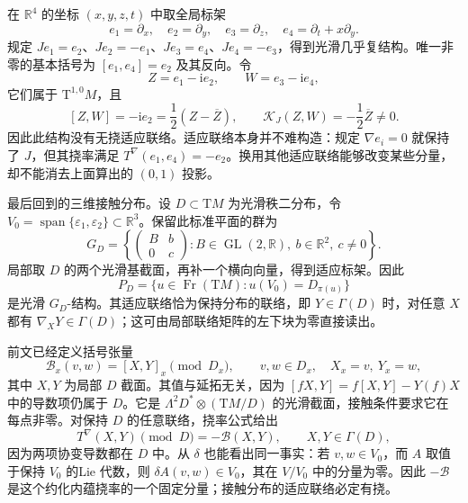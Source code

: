 \begin{example}
	\label{g1:exm:almost-complex-nonzero-intrinsic}
	在 \(\mathbb R^4\) 的坐标 \((x,y,z,t)\) 中取全局标架
	\[
		e_1=\partial_x,\quad e_2=\partial_y,\quad
		e_3=\partial_z,\quad e_4=\partial_t+x\partial_y.
	\]
	规定 \(Je_1=e_2\)、\(Je_2=-e_1\)、\(Je_3=e_4\)、\(Je_4=-e_3\)，得到光滑几乎复结构。唯一非零的基本括号为 \([e_1,e_4]=e_2\) 及其反向。令
	\[
		Z=e_1-\mathrm i e_2,\qquad W=e_3-\mathrm i e_4,
	\]
	它们属于 \(\mathrm{T}^{1,0}M\)，且
	\[
		[Z,W]=-\mathrm i e_2=\frac12(Z-\overline Z),
		\qquad \mathcal K_J(Z,W)=-\frac12\overline Z\neq0.
	\]
	因此此结构没有无挠适应联络。适应联络本身并不难构造：规定 \(\nabla e_i=0\) 就保持了 \(J\)，但其挠率满足 \(T^\nabla(e_1,e_4)=-e_2\)。换用其他适应联络能够改变某些分量，却不能消去上面算出的 \((0,1)\) 投影。
\end{example}

最后回到的三维接触分布。设 \(D\subset\mathrm{T}M\) 为光滑秩二分布，令 \(V_0=\operatorname{span}\{\varepsilon_1,\varepsilon_2\}\subset\mathbb R^3\)。保留此标准平面的群为
\[
	G_D=\left\{\begin{pmatrix}B&b\\0&c\end{pmatrix}:
	B\in\operatorname{GL}(2,\mathbb R),\ b\in\mathbb R^2,\ c\neq0\right\}.
\]
局部取 \(D\) 的两个光滑基截面，再补一个横向向量，得到适应标架。因此
\[
	P_D=\{u\in\operatorname{Fr}(\mathrm{T}M):u(V_0)=D_{\pi(u)}\}
\]
是光滑 \(G_D\)-结构。其适应联络恰为保持分布的联络，即 \(Y\in\Gamma(D)\) 时，对任意 \(X\) 都有 \(\nabla_XY\in\Gamma(D)\)；这可由局部联络矩阵的左下块为零直接读出。

\ProseParagraphBreak

前文已经定义括号张量
\[
	\mathcal B_x(v,w)=[X,Y]_x\pmod{D_x},
	\qquad v,w\in D_x,\quad X_x=v,\ Y_x=w,
\]
其中 \(X,Y\) 为局部 \(D\) 截面。其值与延拓无关，因为 \([fX,Y]=f[X,Y]-Y(f)X\) 中的导数项仍属于 \(D\)。它是 \(\Lambda^2D^*\otimes(\mathrm{T}M/D)\) 的光滑截面，接触条件要求它在每点非零。对保持 \(D\) 的任意联络，挠率公式给出
\begin{equation}
	\label{g1:eq:distribution-intrinsic-torsion}
	T^\nabla(X,Y)\pmod D=-\mathcal B(X,Y),\qquad X,Y\in\Gamma(D),
\end{equation}
因为两项协变导数都在 \(D\) 中。从 \(\delta\) 也能看出同一事实：若 \(v,w\in V_0\)，而 \(A\) 取值于保持 \(V_0\) 的Lie 代数，则 \(\delta A(v,w)\in V_0\)，其在 \(V/V_0\) 中的分量为零。因此 \(-\mathcal B\) 是这个约化内蕴挠率的一个固定分量；接触分布的适应联络必定有挠。

